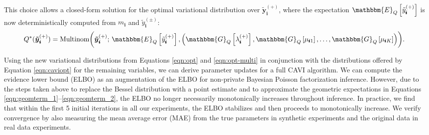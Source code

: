 \documentclass{article}
\newcommand{\subs}{\pmb{i}}
\newcommand{\wsup}[2]{#1_{\subs}^{(#2)}}
\newcommand{\ytP}{\wsup{\tilde{y}}{+}}
\newcommand{\ytPM}{\wsup{\tilde{y}}{\pm}}
\newcommand{\lamP}{\wsup{\lambda}{+}}
\newcommand{\ms}{m_{\subs}}
\newcommand{\yvtP}{\boldsymbol{\tilde{y}}_{\subs}^{(+)}}
\newcommand{\Eq}[1]{\mathbbm{E}_Q\left[#1\right]}
\newcommand{\Vq}[1]{\mathbbm{V}_Q\left[#1\right]}
\newcommand{\Gq}[1]{\mathbbm{G}_Q\left[#1\right]}
\begin{document}
  This choice allows a closed-form solution for the optimal variational
  distribution over $\yvtP$, where the expectation $\Eq{\ytP}$ is now
  deterministically computed from $\ms$ and $\ytPM$:
  \begin{equation}
  \label{eqn:opt-multi}
  Q^*(\yvtP) = \textup{Multinom} \biggl(\yvtP;\, \Eq{\ytP}, \left(\Gq{\lamP}, \Gq{\mu_{\subs 1}}, \dots, \Gq{\mu_{\subs K}} \right) \biggr).
  \end{equation}
  
  
  Using the new variational distributions from Equations \ref{eqn:opt} and
  \ref{eqn:opt-multi} in conjunction with the distributions offered by Equation
  \ref{eqn:caviopt} for the remaining variables, we can derive parameter updates
  for a full CAVI algorithm. We can compute the evidence lower bound (ELBO) as
  an augmentation of the ELBO for non-private Bayesian Poisson factorization
  inference. However, due to the steps taken above to replace the Bessel
  distribution with a point estimate and to approximate the geometric
  expectations in Equations \ref{eqn:geomterm_1}--\ref{eqn:geomterm_2}, the ELBO
  no longer necessarily monotonically increases throughout inference. In
  practice, we find that within the first 5 initial iterations in all our
  experiments, the ELBO stabilizes and then proceeds to monotonically increase.
  We verify convergence by also measuring the mean average error (MAE) from the
  true parameters in synthetic experiments and the original data in real data
  experiments.
  
\end{document}
